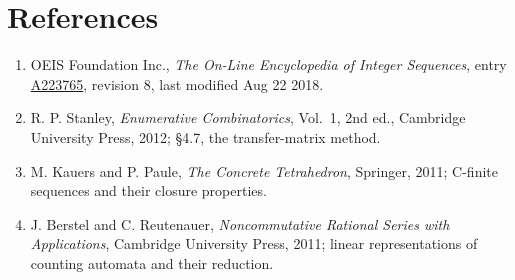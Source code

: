 \documentclass[11pt]{article}
\theoremstyle{definition}
\begin{document}
\section{References}

\begin{enumerate}

\item OEIS Foundation Inc., \emph{The On-Line Encyclopedia of Integer Sequences}, entry \href{https://oeis.org/A223765}{A223765}, revision 8, last modified Aug 22 2018.

\item R. P. Stanley, \emph{Enumerative Combinatorics}, Vol.~1, 2nd ed., Cambridge University Press, 2012; \S4.7, the transfer-matrix method.

\item M. Kauers and P. Paule, \emph{The Concrete Tetrahedron}, Springer, 2011; C-finite sequences and their closure properties.

\item J. Berstel and C. Reutenauer, \emph{Noncommutative Rational Series with Applications}, Cambridge University Press, 2011; linear representations of counting automata and their reduction.

\end{enumerate}
\end{document}
